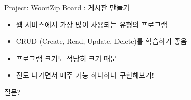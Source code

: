 \documentclass{beamer}
\begin{document}
    \begin{frame}{Project: WooriZip Board : 게시판 만들기}
        \begin{itemize}
            \item 웹 서비스에서 가장 많이 사용되는 유형의 프로그램
            \item CRUD (Create, Read, Update, Delete)를 학습하기 좋음
            \item 프로그램 크기도 적당히 크기 때문
            \item 진도 나가면서 매주 기능 하나하나 구현해보기!
        \end{itemize}
    \end{frame}

    \begin{frame}{질문?}

    \end{frame}
\end{document}
